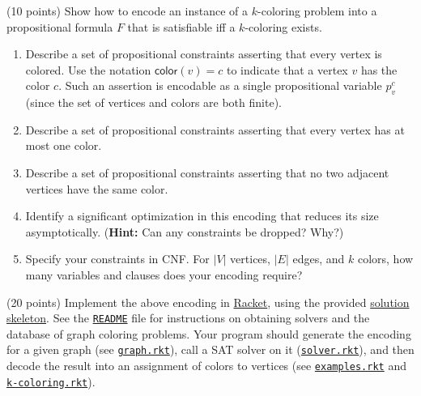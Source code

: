 \documentclass{handout}
\begin{document}
\begin{questions}
\item (10 points) Show how to encode an instance of a $k$-coloring problem into a propositional formula $F$ that is satisfiable iff a $k$-coloring exists.
\begin{enumerate}
\item Describe a set of propositional constraints asserting that every vertex is colored.  Use the notation $\mathsf{color}(v) = c$ to indicate that a vertex $v$ has the color $c$.  Such an assertion is encodable as a single propositional variable $p^c_v$ (since the set of vertices and colors are both finite).



\item Describe a set of propositional constraints asserting that every vertex has at most one color. 



\item Describe a set of propositional constraints asserting that no two adjacent vertices have the same color.  



\item Identify a significant optimization in this encoding that reduces its size asymptotically.  (\textbf{Hint:} Can any constraints be dropped?  Why?)



\item Specify your constraints in CNF.  For $|V|$ vertices, $|E|$ edges, and $k$ colors, how many variables and clauses does your encoding require?



\end{enumerate} \label{prob:encoding}

\item (20 points) \label{prob:kcol} Implement the above encoding in \href{http://racket-lang.org}{Racket}, using the provided \href{\gitlab/tree/master/hw1/graph-coloring}{solution skeleton}.  See the  \href{\gitlab/blob/master/hw1/README.md}{\texttt{README}} file for instructions on obtaining solvers and the database of graph coloring problems.  Your program should generate the encoding for a given graph (see \href{\gitlab/tree/master/hw1/graph-coloring/graph.rkt}{\texttt{graph.rkt}}), call a SAT solver on it (\href{\gitlab/tree/master/hw1/graph-coloring/solver.rkt}{\texttt{solver.rkt}}), and then decode the result into an assignment of colors to vertices  (see \href{\gitlab/tree/master/hw1/graph-coloring/examples.rkt}{\texttt{examples.rkt}} and \href{\gitlab/tree/master/hw1/graph-coloring/k-coloring.rkt}{\texttt{k-coloring.rkt}}).


\end{questions}
\end{document}
